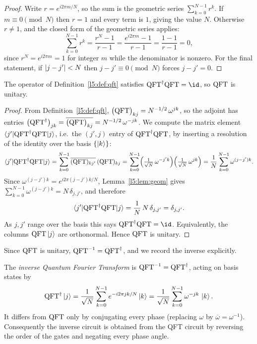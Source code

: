 \begin{proof}
Write $r = e^{i 2\pi m/N}$, so the sum is the geometric series
$\sum_{k=0}^{N-1} r^{k}$. If $m\equiv 0\pmod N$ then $r=1$ and every term is
$1$, giving the value $N$. Otherwise $r\ne 1$, and the closed form of the
geometric series applies:
\[
  \sum_{k=0}^{N-1} r^{k} = \frac{r^{N}-1}{r-1}
  = \frac{e^{i 2\pi m}-1}{r-1} = \frac{1-1}{r-1} = 0,
\]
since $r^{N} = e^{i 2\pi m} = 1$ for integer $m$ while the denominator is
nonzero. For the final statement, if $\lvert j-j'\rvert < N$ then $j-j'\equiv 0
\pmod N$ forces $j-j'=0$.
\end{proof}

\begin{theorem}\label{l5:thm:unitary}
The operator of Definition~\ref{l5:def:qft} satisfies $\QFT^{\dagger}\QFT = \id$,
so $\mathrm{QFT}$ is unitary.
\end{theorem}

\begin{proof}
From Definition~\ref{l5:def:qft}, $\bigl(\mathrm{QFT}\bigr)_{kj} = N^{-1/2}\,\omega^{jk}$,
so the adjoint has entries
$\bigl(\mathrm{QFT}^{\dagger}\bigr)_{jk} = \overline{\bigl(\mathrm{QFT}\bigr)_{kj}}
= N^{-1/2}\,\omega^{-jk}$. We compute the matrix element
$\braket{j'|\mathrm{QFT}^{\dagger}\mathrm{QFT}|j}$, i.e.\ the $(j',j)$ entry of
$\mathrm{QFT}^{\dagger}\mathrm{QFT}$, by inserting a resolution of the identity over the
basis $\{\ket{k}\}$:
\[
  \braket{j'|\mathrm{QFT}^{\dagger}\mathrm{QFT}|j}
    = \sum_{k=0}^{N-1} \overline{(\mathrm{QFT})_{kj'}}\,(\mathrm{QFT})_{kj}
    = \sum_{k=0}^{N-1}
        \Bigl(\tfrac{1}{\sqrt N}\,\omega^{-j'k}\Bigr)
        \Bigl(\tfrac{1}{\sqrt N}\,\omega^{jk}\Bigr)
    = \frac{1}{N}\sum_{k=0}^{N-1}\omega^{(j-j')k}.
\]
Since $\omega^{(j-j')k} = e^{i2\pi (j-j')k/N}$, Lemma~\ref{l5:lem:geom} gives
$\sum_{k=0}^{N-1}\omega^{(j-j')k} = N\,\delta_{j,j'}$, and therefore
\[
  \braket{j'|\mathrm{QFT}^{\dagger}\mathrm{QFT}|j}
    = \frac{1}{N}\,N\,\delta_{j,j'} = \delta_{j,j'} .
\]
As $j,j'$ range over the basis this says $\QFT^{\dagger}\QFT = \id$. Equivalently,
the columns $\mathrm{QFT}\ket{j}$ are orthonormal. Hence $\mathrm{QFT}$ is unitary.
\end{proof}

Since $\mathrm{QFT}$ is unitary, $\mathrm{QFT}^{-1} = \mathrm{QFT}^{\dagger}$, and we record the inverse
explicitly.

\begin{definition}\label{l5:def:iqft}
The \emph{inverse Quantum Fourier Transform} is $\mathrm{QFT}^{-1} = \mathrm{QFT}^{\dagger}$,
acting on basis states by
\[
  \mathrm{QFT}^{\dagger}\ket{j}
   = \frac{1}{\sqrt N}\sum_{k=0}^{N-1} e^{-i 2\pi j k / N}\ket{k}
   = \frac{1}{\sqrt N}\sum_{k=0}^{N-1} \omega^{-jk}\,\ket{k}.
\]
It differs from $\mathrm{QFT}$ only by conjugating every phase (replacing $\omega$ by
$\overline{\omega}=\omega^{-1}$). Consequently the inverse circuit is obtained
from the QFT circuit by reversing the order of the gates and negating every
phase angle.
\end{definition}

